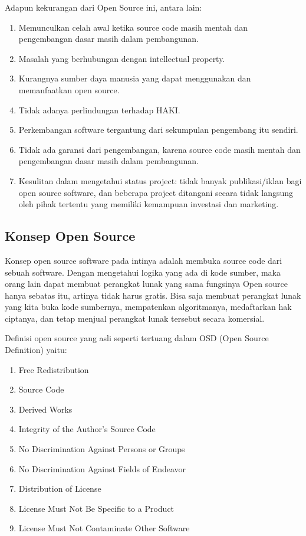 \documentclass[../wastek.tex]{subfiles}
\begin{document}
Adapun kekurangan dari Open Source ini, antara lain:
\begin{enumerate}
	\item Memunculkan celah awal ketika source code masih mentah dan pengembangan dasar masih dalam pembangunan.
	\item Masalah yang berhubungan dengan intellectual property.
	\item Kurangnya sumber daya manusia yang dapat menggunakan dan memanfaatkan open source.
	\item Tidak adanya perlindungan terhadap HAKI.
	\item Perkembangan software tergantung dari sekumpulan pengembang itu sendiri.
	\item Tidak ada garansi dari pengembangan, karena source code masih mentah dan pengembangan dasar masih dalam pembangunan.
	\item Kesulitan dalam mengetahui status project: tidak banyak publikasi/iklan bagi open source software, dan beberapa project ditangani secara tidak langsung oleh pihak tertentu yang memiliki kemampuan investasi dan marketing.
\end{enumerate}

\subsection{Konsep Open Source}%
\label{sub:Konsep Open Source}
Konsep open source software pada intinya adalah membuka source code dari sebuah software. Dengan mengetahui logika yang ada di kode sumber, maka orang lain dapat membuat perangkat lunak yang sama fungsinya Open source hanya sebatas itu, artinya tidak harus gratis. Bisa saja membuat perangkat lunak yang kita buka kode sumbernya, mempatenkan algoritmanya, medaftarkan hak ciptanya, dan tetap menjual perangkat lunak tersebut secara komersial.

Definisi open source yang asli seperti tertuang dalam OSD (Open Source Definition) yaitu:


\begin{enumerate}
	\item Free Redistribution
	\item Source Code
	\item Derived Works
	\item Integrity of the Author's Source Code
	\item No Discrimination Against Persons or Groups
	\item No Discrimination Against Fields of Endeavor
	\item Distribution of License
	\item License Must Not Be Specific to a Product
	\item License Must Not Contaminate Other Software
\end{enumerate}
\end{document}
